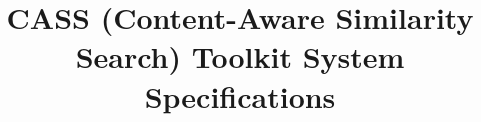 \documentclass[]{article}
\begin{document}
\title{CASS (Content-Aware Similarity Search) Toolkit System Specifications}

\maketitle














\end{document}
